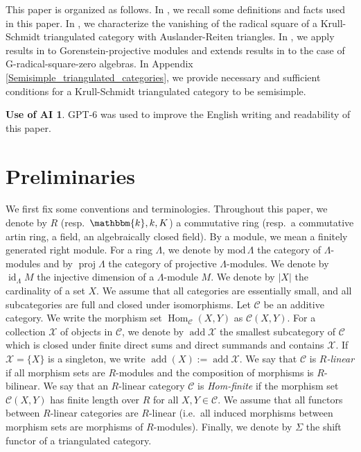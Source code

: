 \documentclass[12pt]{amsart}
\numberwithin{equation}{subsection}
\theoremstyle{plain}
\theoremstyle{definition}
\newtheorem*{UseOfAI}{Use of AI}
\newcommand{\Hom}{\operatorname{Hom}}
\newcommand{\add}{\operatorname{add}}
\renewcommand{\mod}{\mathrm{mod}\,}
\newcommand{\proj}{\operatorname{proj}}
\newcommand{\injdim}{\operatorname{id}}
\renewcommand{\L}{\Lambda}
\newcommand{\C}{\mathcal{C}}
\newcommand{\X}{\mathcal{X}}
\begin{document}
This paper is organized as follows.
In , we recall some definitions and facts used in this paper.
In , we characterize the vanishing of the radical square of a Krull-Schmidt triangulated category with Auslander-Reiten triangles.
In , we apply results in  to Gorenstein-projective modules and extends results in \cite[Section 3]{Hafezi-Bahlekeh_2024} to the case of G-radical-square-zero algebras.
In Appendix \ref{Semisimple_triangulated_categories}, we provide necessary and sufficient conditions for a Krull-Schmidt triangulated category to be semisimple.


\begin{UseOfAI}
GPT-6 was used to improve the English writing and readability of this paper.
\end{UseOfAI}










\section{Preliminaries}\label{Preliminaries}


We first fix some conventions and terminologies.
Throughout this paper, we denote by $R$ (resp.~$\mathbbm{k}, k, K$) a commutative ring (resp.~a commutative artin ring, a field, an algebraically closed field).
By a module, we mean a finitely generated right module.
For a ring $\L$, we denote by $\mod\L$ the category of $\L$-modules and by $\proj\L$ the category of projective $\L$-modules.
We denote by 
$\injdim_{\L}M$ the injective dimension of a $\L$-module $M$.
We denote by $|X|$ the cardinality of a set $X$.
We assume that all categories are essentially small, and all subcategories are full and closed under isomorphisms.
Let $\C$ be an additive category.
We write the morphism set $\Hom_\C(X, Y)$ as $\C(X, Y)$.
For a collection $\X$ of objects in $\C$, we denote by $\add\X$ the smallest subcategory of $\C$ which is closed under finite direct sums and direct summands and contains $\X$. 
If $\X=\{X\}$ is a singleton, we write $\add(X) := \add\X$.
We say that $\C$ is {\it $R$-linear} if all morphism sets are $R$-modules and the composition of morphisms is $R$-bilinear.
We say that an $R$-linear category $\C$ is {\it Hom-finite} if the morphism set $\C(X, Y)$ has finite length over $R$ for all $X, Y \in \C$.  
We assume that all functors between $R$-linear categories are $R$-linear (i.e.~all induced morphisms between morphism sets are morphisms of $R$-modules). 
Finally, we denote by $\Sigma$ the shift functor of a triangulated category.
\end{document}
